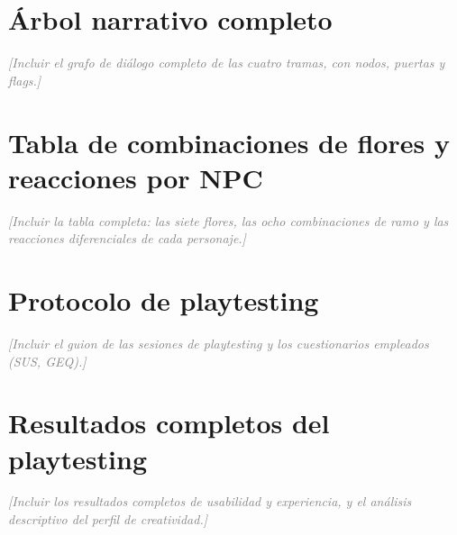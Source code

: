 \documentclass[12pt,twoside,titlepage]{report}
\begin{document}
\chapter{Árbol narrativo completo}
\textcolor{gray}{\textit{[Incluir el grafo de diálogo completo de las cuatro tramas, con nodos, puertas y flags.]}}

\chapter{Tabla de combinaciones de flores y reacciones por NPC}
\textcolor{gray}{\textit{[Incluir la tabla completa: las siete flores, las ocho combinaciones de ramo y las reacciones diferenciales de cada personaje.]}}

\chapter{Protocolo de playtesting}
\textcolor{gray}{\textit{[Incluir el guion de las sesiones de playtesting y los cuestionarios empleados (SUS, GEQ).]}}

\chapter{Resultados completos del playtesting}
\textcolor{gray}{\textit{[Incluir los resultados completos de usabilidad y experiencia, y el análisis descriptivo del perfil de creatividad.]}}

\end{document}

